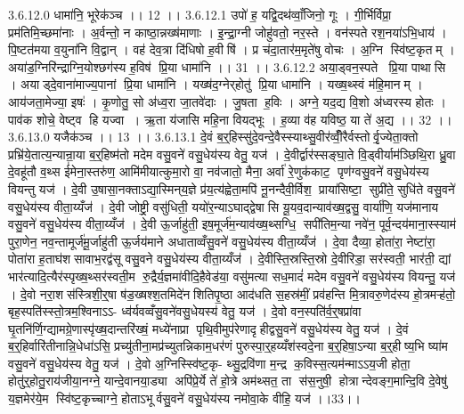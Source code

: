 3.6.12.0
धामा॑नि॒ भूरेक॑ञ्च ।। 12 ।।
3.6.12.1
उपो॑ ह॒ यद्वि॒दथ॑व्वाँ॒जिनो॒ गूः । गी॒र्भिर्विप्रा॒ प्रम॑तिमि॒च्छमा॑नाः । अ॒र्वन्तो॒ न काष्ठा॒न्नख्ष॑माणाः । इ॒न्द्रा॒ग्नी जोहु॑वतो॒ नर॒स्ते । वन॑स्पते रश॒नया॑ऽभि॒धाय॑ । पि॒ष्टत॑मया व॒युना॑नि वि॒द्वान् । वह॑ देव॒त्रा दि॑धिषो ह॒वीषि॑ । प्र च॑दा॒तार॑म॒मृते॑षु वोचः । अ॒ग्नि स्वि॑ष्ट॒कृतम् । अया॑ड॒ग्निरि॑न्द्राग्नि॒योश्छग॑स्य ह॒विष॑ प्रि॒या धामा॑नि ।। 31 ।।
3.6.12.2
अया॒ड्वन॒स्पते प्रि॒या पाथा॑सि । अयाड्दे॒वाना॑माज्य॒पानां प्रि॒या धामा॑नि । यख्ष॑द॒ग्नेर्‌होतु॑ प्रि॒या धामा॑नि । यख्ष॒थ्स्वं म॑हि॒मानम् । आय॑जता॒मेज्या॒ इषः॑ । कृ॒णोतु॒ सो अ॑ध्व॒रा जा॒तवे॑दाः । जु॒षता॑ ह॒विः । अग्ने॒ यद॒द्य वि॒शो अ॑ध्वरस्य होतः । पाव॑क शोचे॒ वेष्ट्व हि यज्वा । ऋ॒ता य॑जासि महि॒ना वियद्भूः । ह॒व्या व॑ह यविष्ठ॒ या ते॑ अ॒द्य ।। 32 ।।
3.6.13.0
यजैक॑ञ्च ।। 13 ।।
3.6.13.1
दे॒वं ब॒र्॒हिस्सु॑दे॒वन्दे॒वैस्स्याथ्सु॒वीर॑व्वीँ॒रैर्वस्तोर्वृ॒ज्येता॒क्तो प्रभ्रि॑ये॒तात्य॒न्यान्रा॒या ब॒र्॒हिष्म॑तो मदेम वसु॒वने॑ वसु॒धेय॑स्य वेतु॒ यज॑ । दे॒वीर्द्वार॑स्सङ्घा॒ते वि॒ड्वीर्याम॑ञ्छिथि॒रा ध्रु॒वा दे॒वहू॑तौ व॒थ्स ई॑मेना॒स्तरु॑ण॒ आमि॑मीयात्कुमा॒रो वा॒ नव॑जातो॒ मैना॒ अर्वा॑ रे॒णुक॑काट॒ पृण॑ग्वसु॒वने॑ वसु॒धेय॑स्य वियन्तु यज॑ । दे॒वी उ॒षासा॒नक्ताऽद्या॒स्मिन्‌य॒ज्ञे प्र॑य॒त्य॑ह्वेता॒मपि॑ नू॒नन्दैवी॒र्विश॒ प्राया॑सिष्टा॒॒ सुप्री॑ते॒ सुधि॑ते वसु॒वने॑ वसु॒धेय॑स्य वीता॒य्यँज॑ । दे॒वी जोष्ट्री॒ वसु॑धिती॒ ययो॑र॒न्याऽघाद्द्वेषा॑सि यू॒यव॒दान्याव॑ख्ष॒द्वसु॒ वार्या॑णि॒ यज॑मानाय वसु॒वने॑ वसु॒धेय॑स्य वीता॒य्यँज॑ । दे॒वी ऊ॒र्जाहु॑ती॒ इष॒मूर्ज॑म॒न्याव॑ख्ष॒थ्सग्धि॒॒ सपी॑तिम॒न्या नवे॑न॒ पूर्व॒न्दय॑माना॒स्स्याम॑ पुरा॒णेन॒ नव॒न्तामूर्ज॑मू॒र्जाहु॑ती ऊ॒र्जय॑माने अधाताव्वँसु॒वने॑ वसु॒धेय॑स्य वीता॒य्यँज॑ । दे॒वा दैव्या॒ होता॑रा॒ नेष्टा॑रा॒ पोता॑रा ह॒ताघ॑शसावाभ॒रद्व॑सू वसु॒वने वसु॒धेय॑स्य वीता॒य्यँज॑ । दे॒वीस्ति॒स्रस्ति॒स्रो दे॒वीरिडा॒ सर॑स्वती॒ भार॑ती॒ द्यां भार॑त्यादि॒त्यैर॑स्पृख्ष॒थ्सर॑स्वती॒म रु॒द्रैर्य॒ज्ञमा॑वीदि॒हैवेड॑या॒ वसु॑मत्या सध॒मादं॑ मदेम वसु॒वने॑ वसु॒धेय॑स्य वियन्तु॒ यज॑ । दे॒वो नरा॒शस॑स्त्रिशी॒र्॒षा ष॑ड॒ख्षश्श॒तमिदे॑नशितिपृ॒ष्ठा आद॑धति स॒हस्र॑मीं॒ प्रव॑हन्ति मि॒त्रावरु॒णेद॑स्य हो॒त्रमऱ्ह॑तो॒ बृह॒स्पति॑स्स्तो॒त्रम॒श्विनाऽऽ- ध्व॑र्यवव्वँसु॒वने॑वसु॒धेयस्य॑ वेतु॒ यज॑ । दे॒वो वन॒स्पति॑र्व॒र्॒षप्रा॑वा घृ॒तनि॑र्णि॒ग्द्यामग्रे॒णास्पृ॑ख्ष॒दान्तरि॑ख्षं॒ मध्ये॑नाप्रा पृथि॒वीमुप॑रेणादृहीद्वसु॒वने॑ वसु॒धेय॑स्य वेतु॒ यज॑ । दे॒वं ब॒र्॒हिर्वारि॑तीनान्नि॒धेधा॑ऽसि॒ प्रच्यु॑तीना॒मप्र॑च्युतन्निकाम॒धर॑णं पुरुस्पा॒र्॒हय्यँश॑स्वदे॒ना ब॒र्॒हिषा॒ऽन्या ब॒र्॒हीष्य॒भि ष्या॑म वसु॒वने॑ वसु॒धेय॑स्य वेतु॒ यज॑ । दे॒वो अ॒ग्निस्स्वि॑ष्ट॒कृ- थ्सु॒द्रवि॑णा म॒न्द्र क॒विस्स॒त्यम॑न्माऽऽय॒जी होता॒ होतु॑र्॒होतु॒राय॑जीया॒नग्ने॒ यान्दे॒वानया॒ड्या अपि॑प्रे॒र्ये ते॑ हो॒त्रे अम॑थ्सत॒ ता स॑स॒नुषी॒॒ होत्रान्देवङ्ग॒मान्दि॒वि दे॒वेषु॑ य॒ज्ञमेर॑ये॒म स्वि॑ष्ट॒कृच्चाग्ने॒ होताऽभूर्वसु॒वने॑ वसु॒धेय॑स्य नमोवा॒के वीहि॒ यज॑ ।।33।।
